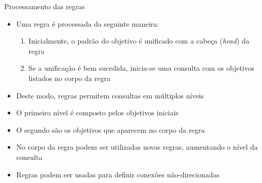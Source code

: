 \begin{frame}[fragile]{Processamento das regras}

    \begin{itemize}
        \item Uma regra é processada da seguinte maneira:

        \begin{enumerate}
            \item Inicialmente, o padrão do objetivo é unificado com a cabeça (\textit{head}) 
                da regra
            \item Se a unificação é bem sucedida, inicia-se uma consulta com os objetivos 
                listados no corpo da regra
        \end{enumerate}

        \item Deste modo, regras permitem consultas em múltiplos níveis
        
        \item O primeiro nível é composto pelos objetivos iniciais

        \item O segundo são os objetivos que aparecem no corpo da regra

        \item No corpo da regra podem ser utilizadas novas regras, aumentando o nível da 
            consulta

        \item Regras podem ser usadas para definir conexões não-direcionadas

    \end{itemize}

\end{frame}

